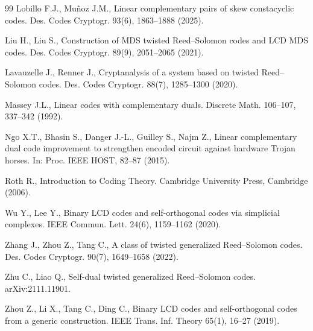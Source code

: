 \documentclass[12pt,draftcls,journal,onecolumn]{IEEEtran}
\begin{document}
\begin{thebibliography}{99}
Lobillo F.J., Mu\~noz J.M.,
Linear complementary pairs of skew constacyclic codes.
Des. Codes Cryptogr. 93(6), 1863--1888 (2025).

Liu H., Liu S., Construction of MDS twisted Reed--Solomon codes and LCD MDS codes. Des. Codes Cryptogr. 89(9), 2051--2065 (2021).

Lavauzelle J., Renner J., Cryptanalysis of a system based on twisted Reed--Solomon codes. Des. Codes Cryptogr. 88(7), 1285--1300 (2020).

Massey J.L., Linear codes with complementary duals. Discrete Math. 106--107, 337--342 (1992).

Ngo X.T., Bhasin S., Danger J.-L., Guilley S., Najm Z., Linear complementary dual code improvement to strengthen encoded circuit against hardware Trojan horses. In: Proc. IEEE HOST, 82--87 (2015).

Roth R., Introduction to Coding Theory. Cambridge University Press, Cambridge (2006).

Wu Y., Lee Y., Binary LCD codes and self-orthogonal codes via simplicial complexes. IEEE Commun. Lett. 24(6), 1159--1162 (2020).

Zhang J., Zhou Z., Tang C., A class of twisted generalized Reed--Solomon codes. Des. Codes Cryptogr. 90(7), 1649--1658 (2022).

Zhu C., Liao Q., Self-dual twisted generalized Reed--Solomon codes. arXiv:2111.11901.

Zhou Z., Li X., Tang C., Ding C., Binary LCD codes and self-orthogonal codes from a generic construction. IEEE Trans. Inf. Theory 65(1), 16--27 (2019).

\end{thebibliography}
\end{document}
